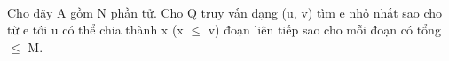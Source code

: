  

Cho dãy A gồm N phần tử. Cho Q truy vấn dạng (u, v) tìm e nhỏ nhất sao cho từ e tới u có thể chia thành x (x  $\le$  v) đoạn liên tiếp sao cho mỗi đoạn có tổng  $\le$  M.